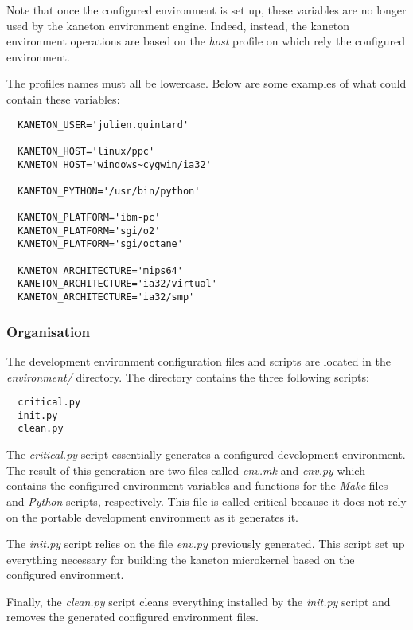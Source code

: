Note that once the configured environment is set up, these variables are
no longer used by the kaneton environment engine. Indeed, instead, the
kaneton environment operations are based on the \textit{host} profile on
which rely the configured environment.

The profiles names must all be lowercase. Below are some examples of what
could contain these variables:

\begin{verbatim}
  KANETON_USER='julien.quintard'

  KANETON_HOST='linux/ppc'
  KANETON_HOST='windows~cygwin/ia32'

  KANETON_PYTHON='/usr/bin/python'

  KANETON_PLATFORM='ibm-pc'
  KANETON_PLATFORM='sgi/o2'
  KANETON_PLATFORM='sgi/octane'

  KANETON_ARCHITECTURE='mips64'
  KANETON_ARCHITECTURE='ia32/virtual'
  KANETON_ARCHITECTURE='ia32/smp'
\end{verbatim}

%
%

\subsubsection{Organisation}

The development environment configuration files and scripts are located in
the \textit{environment/} directory. The directory contains the three
following scripts:

\begin{verbatim}
  critical.py
  init.py
  clean.py
\end{verbatim}

The \textit{critical.py} script essentially generates a configured development
environment. The result of this generation are two files called
\textit{env.mk} and \textit{env.py} which contains the configured environment
variables and functions for the \textit{Make} files and \textit{Python}
scripts, respectively. This file is called critical because it does not rely
on the portable development environment as it generates it.

The \textit{init.py} script relies on the file \textit{env.py} previously
generated. This script set up everything necessary for building the
kaneton microkernel based on the configured environment.

Finally, the \textit{clean.py} script cleans everything installed by the
\textit{init.py} script and removes the generated configured environment files.

